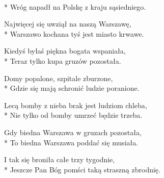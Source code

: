 \begin{lyrics}[longestline={Jeszcze Pan Bóg pomści taką straszną zbrodnię.}]

\\*
Wróg napadł na Polskę z kraju sąsiedniego.

Najwięcej się uwziął na naszą Warszawę,\\*
Warszawo kochana tyś jest miasto krwawe.

Kiedyś byłaś piękna bogata wspaniała,\\*
Teraz tylko kupa gruzów pozostała.

Domy popalone, szpitale zburzone,\\*
Gdzie się mają schronić ludzie poranione.

Lecą bomby z nieba brak jest ludziom chleba,\\*
Nie tylko od bomby umrzeć będzie trzeba.

Gdy biedna Warszawa w gruzach pozostała,\\*
To biedna Warszawa poddać się musiała.

I tak się broniła całe trzy tygodnie,\\*
Jeszcze Pan Bóg pomści taką straszną zbrodnię.
\end{lyrics}


